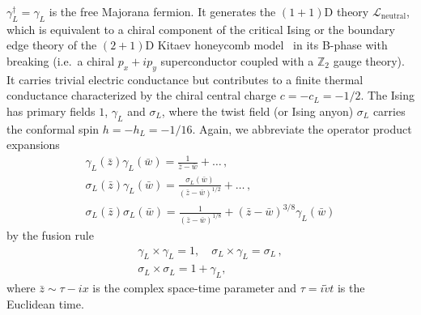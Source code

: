 $\gamma_L^\dagger=\gamma_L$ is the free Majorana fermion. It generates the $(1+1)$D theory $\mathcal{L}_{\mathrm{neutral}}$, which is equivalent to a chiral component of the critical Ising \CFT or the boundary edge theory of the $(2+1)$D Kitaev honeycomb model~\cite{Kitaev06} in its B-phase with \TR breaking (i.e.~a chiral $p_x+ip_y$ superconductor coupled with a $\mathbb{Z}_2$ gauge theory). It carries trivial electric conductance but contributes to a finite thermal conductance characterized by the chiral central charge $c=-c_L=-1/2$. The Ising \CFT has primary fields $1$, $\gamma_L$ and $\sigma_L$, where the twist field (or Ising anyon) $\sigma_L$ carries the conformal spin $h=-h_L=-1/16$. Again, we abbreviate the operator product expansions \begin{gather}\gamma_L(\bar{z})\gamma_L(\bar{w})=\frac{1}{\bar{z}-\bar{w}}+\ldots\nonumber \,, \\\sigma_L(\bar{z})\gamma_L(\bar{w})=\frac{\sigma_L(\bar{w})}{(\bar{z}-\bar{w})^{1/2}}+\ldots\nonumber \,, \\\sigma_L(\bar{z})\sigma_L(\bar{w})=\frac{1}{(\bar{z}-\bar{w})^{1/8}}+(\bar{z}-\bar{w})^{3/8}\gamma_L(\bar{w})\nonumber \end{gather} by the fusion rule \begin{gather}\gamma_L\times\gamma_L=1,\quad\sigma_L\times\gamma_L=\sigma_L\nonumber \,, \\\sigma_L\times\sigma_L=1+\gamma_L,\end{gather} where $\bar{z}\sim\tau-ix$ is the complex space-time parameter and $\tau=i\tilde{v}t$ is the Euclidean time. 

